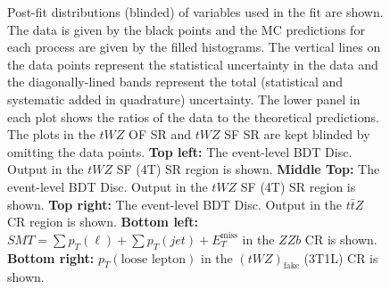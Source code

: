 \begin{figure}[htbp]
        \caption{Post-fit distributions (blinded) of variables used in the fit are shown. The data is given by the black points and the MC predictions for each process are given by the filled histograms. The vertical lines on the data points represent the statistical uncertainty in the data and the diagonally-lined bands represent the total (statistical and systematic added in quadrature) uncertainty. The lower panel in each plot shows the ratios of the data to the theoretical predictions. The plots in the $tWZ$ OF SR and $tWZ$ SF SR are kept blinded by omitting the data points. \textbf{Top left:} The event-level BDT Disc. Output in the $tWZ$ SF (4T) SR region is shown. \textbf{Middle Top:} The event-level BDT Disc. Output in the $tWZ$ SF (4T) SR region is shown. \textbf{Top right:} The event-level BDT Disc. Output in the $t\bar{t}Z$ CR region is shown. \textbf{Bottom left:} $SMT = \sum p_{T} (\ell) + \sum p_{T} (jet) + E_{T}^{\text{miss}}$ in the $ZZb$ CR is shown. \textbf{Bottom right:} $p_{T}(\text{loose lepton})$ in the $(tWZ)_{\text{fake}}$ (3T1L) CR is shown.}
  \label{fig:4lep-postfitPlots}
\end{figure}

